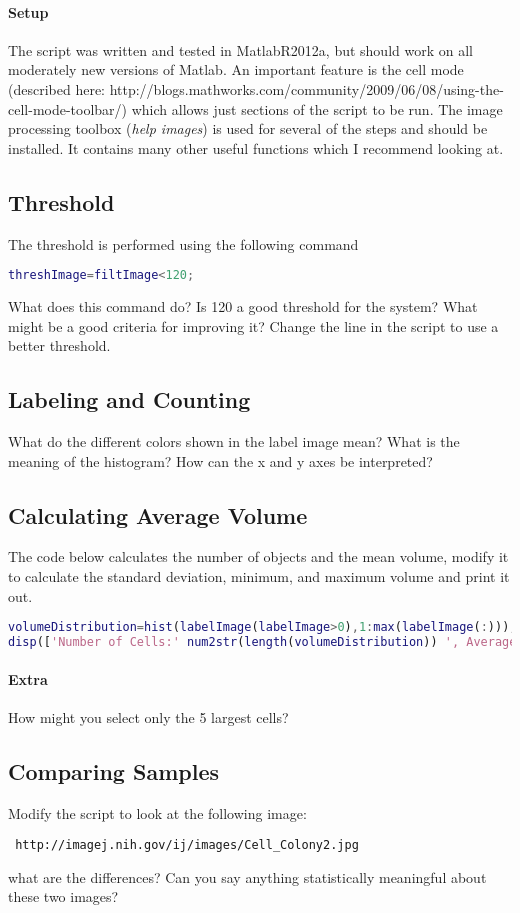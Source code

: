 \documentclass{article}
\begin{document}
\paragraph{Setup} The script was written and tested in MatlabR2012a, but should work on all moderately new versions of Matlab. An important feature is the cell mode (described here: http://blogs.mathworks.com/community/2009/06/08/using-the-cell-mode-toolbar/) which allows just sections of the script to be run. The image processing toolbox ({\it help images}) is used for several of the steps and should be installed. It contains many other useful functions which I recommend looking at. 

\subsection{Threshold}
The threshold is performed using the following command
\begin{lstlisting}[language=matlab]
threshImage=filtImage<120;
\end{lstlisting}
What does this command do? Is 120 a good threshold for the system? What might be a good criteria for improving it? Change the line in the script to use a better threshold.

\subsection{Labeling and Counting}
What do the different colors shown in the label image mean? What is the meaning of the histogram? How can the x and y axes be interpreted?

\subsection{Calculating Average Volume}
The code below calculates the number of objects and the mean volume, modify it to calculate the standard deviation, minimum, and maximum volume and print it out.
\begin{lstlisting}[language=matlab]
volumeDistribution=hist(labelImage(labelImage>0),1:max(labelImage(:)));
disp(['Number of Cells:' num2str(length(volumeDistribution)) ', Average Volume:' num2str(mean(volumeDistribution))])
\end{lstlisting}
 \paragraph{Extra} How might you select only the 5 largest cells?

\subsection{Comparing Samples}
Modify the script to look at the following image: 
\begin{verbatim} http://imagej.nih.gov/ij/images/Cell_Colony2.jpg \end{verbatim} what are the differences? Can you say anything statistically meaningful about these two images?
\end{document}
